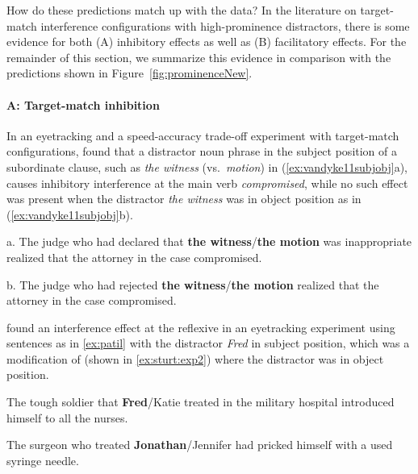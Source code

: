 \documentclass{cambridge7A}\usepackage[]{graphicx}\usepackage[]{color}
\begin{document}
How do these predictions match up with the data?
In the literature on target-match interference configurations with high-prominence distractors, there is some evidence for both (A) inhibitory effects as well as (B) facilitatory effects. 
For the remainder of this section, we summarize this evidence in comparison with the predictions shown in Figure~\ref{fig:prominenceNew}.

\paragraph{A: Target-match inhibition}
In an eyetracking and a speed-accuracy trade-off experiment with target-match configurations, \cite{VanDykeMcElree2011} found that a distractor noun phrase in the subject position of a subordinate clause, such as \textit{the witness} (vs.\ \textit{motion}) in (\ref{ex:vandyke11subjobj}a), causes inhibitory interference at the main verb \textit{compromised}, while no such effect was present when the distractor \textit{the witness} was in object position as in (\ref{ex:vandyke11subjobj}b).

\begin{exe} 
\ex \label{ex:vandyke11subjobj}
\begin{xlist}
\item[a.] The judge who had declared that \textbf{the witness}/\textbf{the motion} was inappropriate realized that the attorney in the case compromised.
\item[b.] The judge who had rejected \textbf{the witness}/\textbf{the motion} realized that the attorney in the case compromised.
\end{xlist}
\end{exe}  

\cite{PatilVasishthLewis2016} found an interference effect at the reflexive in an eyetracking experiment using sentences as in \ref{ex:patil} with the distractor \textit{Fred} in subject position, which was a modification of \cite{Sturt2003} (shown in \ref{ex:sturt:exp2}) where the distractor was in object position.

\begin{exe} 
\ex\label{ex:patil}
The tough soldier that \textbf{Fred}/Katie treated in the military hospital introduced himself to all the nurses.
\end{exe}  

\begin{exe} 
\ex\label{ex:sturt:exp2}
The surgeon who treated \textbf{Jonathan}/Jennifer had pricked himself with a used syringe needle. 
\end{exe}  
\end{document}
